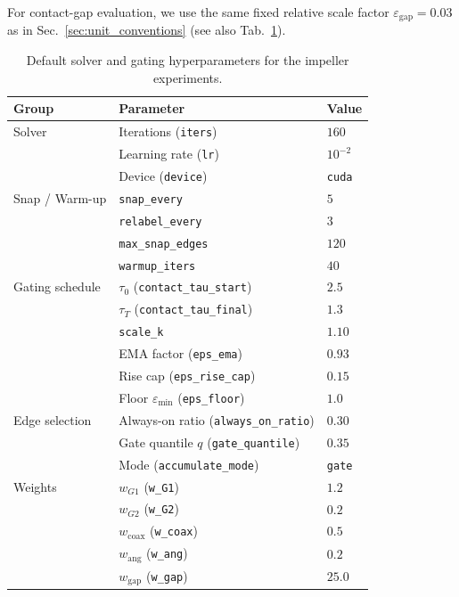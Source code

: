 \documentclass{ieeeaccess}
\begin{document}
For contact-gap evaluation, we use the same fixed relative scale factor
$\varepsilon_{\mathrm{gap}} = 0.03$ as in Sec.~\ref{sec:unit_conventions}
(see also Tab.~\ref{tab:hyperparams}).

\begin{table}[t]
  \caption{Default solver and gating hyperparameters for the impeller experiments.}
  \label{tab:hyperparams}
  \centering
  \footnotesize
  \setlength{\tabcolsep}{3pt}
  \begin{tabular}{l l l}
    \toprule
    \textbf{Group} & \textbf{Parameter} & \textbf{Value} \\
    \midrule
    Solver &
      Iterations (\texttt{iters}) & $160$ \\
    & Learning rate (\texttt{lr}) & $10^{-2}$ \\
    & Device (\texttt{device}) & \texttt{cuda} \\
    \midrule
    Snap / Warm-up &
      \texttt{snap\_every} & $5$ \\
    & \texttt{relabel\_every} & $3$ \\
    & \texttt{max\_snap\_edges} & $120$ \\
    & \texttt{warmup\_iters} & $40$ \\
    \midrule
    Gating schedule &
      $\tau_0$ (\texttt{contact\_tau\_start}) & $2.5$ \\
    & $\tau_T$ (\texttt{contact\_tau\_final}) & $1.3$ \\
    & \texttt{scale\_k} & $1.10$ \\
    & EMA factor (\texttt{eps\_ema}) & $0.93$ \\
    & Rise cap (\texttt{eps\_rise\_cap}) & $0.15$ \\
    & Floor $\varepsilon_{\min}$ (\texttt{eps\_floor}) & $1.0$ \\
    \midrule
    Edge selection &
      Always-on ratio (\texttt{always\_on\_ratio}) & $0.30$ \\
    & Gate quantile $q$ (\texttt{gate\_quantile}) & $0.35$ \\
    & Mode (\texttt{accumulate\_mode}) & \texttt{gate} \\
    \midrule
    Weights &
      $w_{G1}$ (\texttt{w\_G1}) & $1.2$ \\
    & $w_{G2}$ (\texttt{w\_G2}) & $0.2$ \\
    & $w_{\text{coax}}$ (\texttt{w\_coax}) & $0.5$ \\
    & $w_{\text{ang}}$ (\texttt{w\_ang}) & $0.2$ \\
    & $w_{\text{gap}}$ (\texttt{w\_gap}) & $25.0$ \\

\end{tabular}
\end{table}
\end{document}
